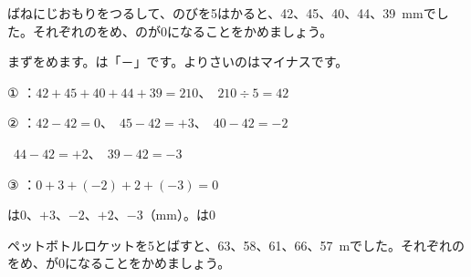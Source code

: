 
\begin{reidai}[\R{偏差}{へん|さ}を\R{求}{もと}める]
ばねにじおもりをつるして、のびを5はかると、42、45、40、44、\qty{39}{mm}でした。それぞれのをめ、のが0になることをかめましょう。\par
\kangaekata まずをめます。は「－」です。よりさいのはマイナスです。\par
\shiki ① ：$42+45+40+44+39=210$、\ $210\div5=42$\par
\hspace*{2.6\zw}② ：$42-42=0$、\ $45-42=+3$、\ $40-42=-2$\par
\hspace*{2.6\zw}\phantom{②}\ $44-42=+2$、\ $39-42=-3$\par
\hspace*{2.6\zw}③ ：$0+3+(-2)+2+(-3)=0$\par
\kotae {}は0、$+3$、$-2$、$+2$、$-3$（mm）。は0
\end{reidai}

\begin{jibun}
ペットボトルロケットを5とばすと、63、58、61、66、\qty{57}{m}でした。それぞれのをめ、が0になることをかめましょう。
\end{jibun}

